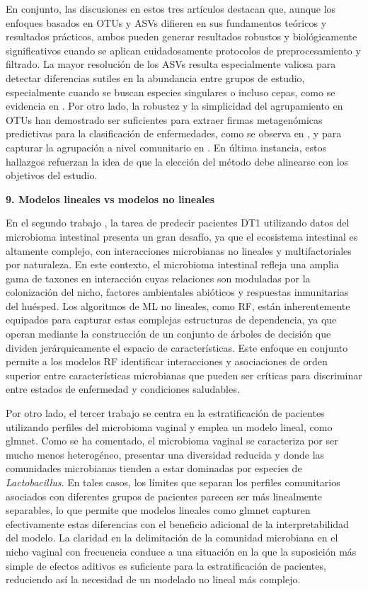 En conjunto, las discusiones en estos tres artículos destacan que, aunque los enfoques basados en OTUs y ASVs difieren en sus fundamentos teóricos y resultados prácticos, ambos pueden generar resultados robustos y biológicamente significativos cuando se aplican cuidadosamente protocolos de preprocesamiento y filtrado. La mayor resolución de los ASVs resulta especialmente valiosa para detectar diferencias sutiles en la abundancia entre grupos de estudio, especialmente cuando se buscan especies singulares o incluso cepas, como se evidencia en \cite{paper1}. Por otro lado, la robustez y la simplicidad del agrupamiento en OTUs han demostrado ser suficientes para extraer firmas metagenómicas predictivas para la clasificación de enfermedades, como se observa en \cite{paper2}, y para capturar la agrupación a nivel comunitario en \cite{paper3}. En última instancia, estos hallazgos refuerzan la idea de que la elección del método debe alinearse con los objetivos del estudio.


\textbf{9. Modelos lineales vs modelos no lineales} 

En el segundo trabajo \cite{paper2}, la tarea de predecir pacientes DT1 utilizando datos del microbioma intestinal presenta un gran desafío, ya que el ecosistema intestinal es altamente complejo, con interacciones microbianas no lineales y multifactoriales por naturaleza. En este contexto, el microbioma intestinal refleja una amplia gama de taxones en interacción cuyas relaciones son moduladas por la colonización del nicho, factores ambientales abióticos y respuestas inmunitarias del huésped. Los algoritmos de ML no lineales, como RF, están inherentemente equipados para capturar estas complejas estructuras de dependencia, ya que operan mediante la construcción de un conjunto de árboles de decisión que dividen jerárquicamente el espacio de características. Este enfoque en conjunto permite a los modelos RF identificar interacciones y asociaciones de orden superior entre características microbianas que pueden ser críticas para discriminar entre estados de enfermedad y condiciones saludables.

Por otro lado, el tercer trabajo \cite{paper3} se centra en la estratificación de pacientes utilizando perfiles del microbioma vaginal y emplea un modelo lineal, como glmnet. Como se ha comentado, el microbioma vaginal se caracteriza por ser mucho menos heterogéneo, presentar una diversidad reducida y donde las comunidades microbianas tienden a estar dominadas por especies de \textit{Lactobacillus}. En tales casos, los límites que separan los perfiles comunitarios asociados con diferentes grupos de pacientes parecen ser más linealmente separables, lo que permite que modelos lineales como glmnet capturen efectivamente estas diferencias con el beneficio adicional de la interpretabilidad del modelo. La claridad en la delimitación de la comunidad microbiana en el nicho vaginal con frecuencia conduce a una situación en la que la suposición más simple de efectos aditivos es suficiente para la estratificación de pacientes, reduciendo así la necesidad de un modelado no lineal más complejo.

